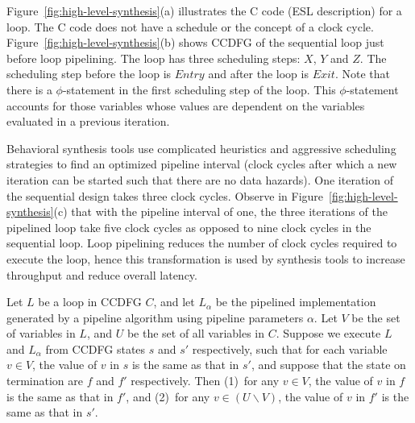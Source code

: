 Figure~\ref{fig:high-level-synthesis}(a) illustrates the C
code (ESL description) for a loop.  The C code does not have
a schedule or the concept of a clock cycle.
Figure~\ref{fig:high-level-synthesis}(b) shows CCDFG of the
sequential loop just before loop pipelining. The loop has
three scheduling steps: $X$, $Y$ and $Z$.  The scheduling
step before the loop is $Entry$ and after the loop is
$Exit$. Note that there is a $\phi$-statement in the
first scheduling step of the loop.  This $\phi$-statement
accounts for those variables whose values are dependent on
the variables evaluated in a previous iteration.

Behavioral synthesis tools use complicated heuristics and aggressive scheduling strategies to
find an optimized pipeline interval (clock cycles after which a new iteration can be started such that there are no data hazards). One iteration of the sequential design takes three
clock cycles. Observe in Figure~\ref{fig:high-level-synthesis}(c) that with the pipeline interval of one, the three iterations of the pipelined loop
take five clock cycles as opposed to nine clock cycles in the sequential loop.
Loop pipelining reduces the number of clock cycles required to execute the loop, hence this transformation is used by synthesis tools to increase throughput and reduce overall latency.




 \smallskip
{}
Let $L$ be a loop in CCDFG $C$, and let $L_{\alpha}$ be the
pipelined implementation generated by a pipeline algorithm using
pipeline parameters $\alpha$.  Let $V$ be the set of
variables in $L$, and $U$ be the set of all
variables in $C$.  Suppose we execute $L$ and $L_{\alpha}$
from CCDFG states $s$ and $s'$ respectively, such that for
each variable $v\in V$, the value of $v$ in $s$ is the same
as that in $s'$, and suppose that the state on termination
are $f$ and $f'$ respectively.  Then (1)~for any $v\in V$,
the value of $v$ in $f$ is the same as that in $f'$, and
(2)~for any $v\in(U\backslash V)$, the value of $v$ in $f'$
is the same as that in $s'$.


